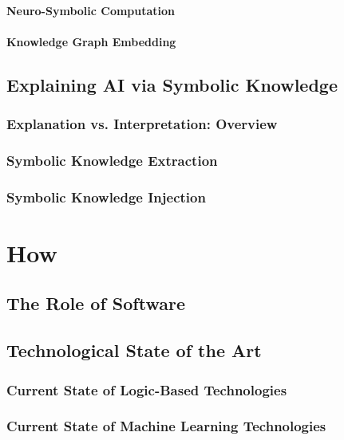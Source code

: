 \documentclass[12pt,a4paper,openright,twoside]{book}
\begin{document}
\subsection{Neuro-Symbolic Computation}

\subsection{Knowledge Graph Embedding}

\chapter{Explaining AI via Symbolic Knowledge}

\section{Explanation vs. Interpretation: Overview}

\section{Symbolic Knowledge Extraction}

\section{Symbolic Knowledge Injection}

\part{How}
\label{part:how}

\chapter{The Role of Software}

\chapter{Technological State of the Art}

\section{Current State of Logic-Based Technologies}

\section{Current State of Machine Learning Technologies}
\end{document}
